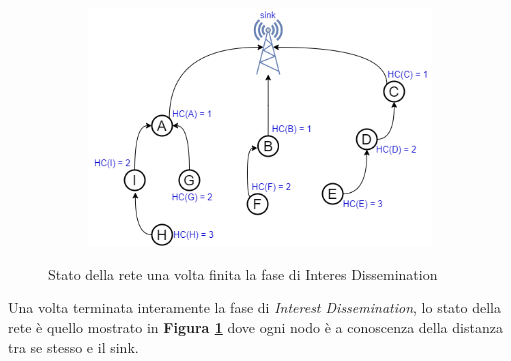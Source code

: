 \begin{figure}[t!]
  \begin{subfigure}[t]{.8\linewidth}
    \includegraphics[width=1.1\linewidth]{Contents/Images/graphs/interestDissemination/hopCount.png}
  \end{subfigure}
  \caption{Stato della rete una volta finita la fase di Interes Dissemination}
  \label{fig:hopCount}
\end{figure}

Una volta terminata interamente la fase di \textit{Interest Dissemination}, lo stato della rete è quello mostrato in  \textbf{Figura \ref{fig:hopCount}} dove ogni nodo è a conoscenza della distanza tra se stesso e il sink. 
